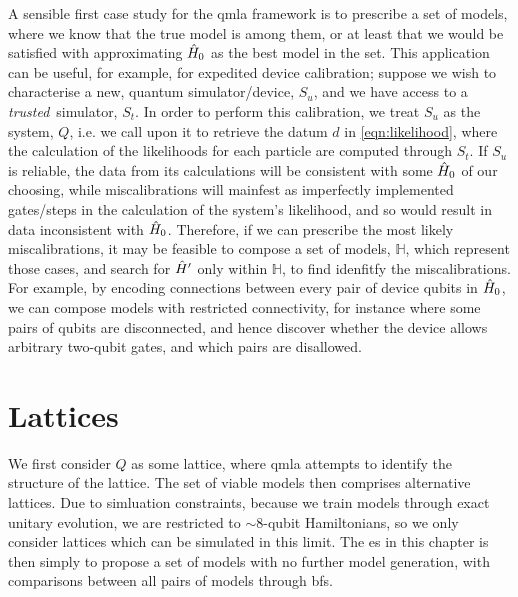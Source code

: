 A sensible first case study for the \gls{qmla} framework is to prescribe a set of models, 
    where we know that the true model is among them, or at least that we would be satisfied with 
    approximating $\hat{H}_0$ as the best model in the set. 
This application can be useful, for example, for expedited device calibration; 
    suppose we wish to characterise a new,  quantum simulator/device, $S_u$, 
    and we have access to a \emph{trusted}\footnotemark \  simulator, $S_t$. 
In order to perform this calibration, 
    we treat $S_u$ as the system, $Q$, i.e. we call upon it to retrieve the datum $d$ in \cref{eqn:likelihood}, 
    where the calculation of the likelihoods for each particle are computed through $S_t$. 
If $S_u$ is reliable, the data from its calculations will be consistent with some $\hat{H}_0$ of our choosing, 
    while miscalibrations will mainfest as imperfectly implemented gates/steps in the calculation of the system's likelihood, 
    and so would result in data inconsistent with $\hat{H}_0$. 
Therefore, if we can prescribe the most likely miscalibrations, it may be feasible to compose a set 
    of models, $\mathbb{H}$, which represent those cases, and search for $\hat{H}^{\prime}$ only within $\mathbb{H}$,
    to find idenfitfy the miscalibrations. 
For example, by encoding connections between every pair of device qubits in $\hat{H}_0$, 
    we can compose models with restricted connectivity, for instance where some pairs of qubits are disconnected, 
    and hence discover whether the device allows arbitrary two-qubit gates, 
    and which pairs are disallowed. 



\section{Lattices}\label{sec:lattices}
We first consider $Q$ as some lattice, where \gls{qmla} attempts to identify the structure of the lattice. 
The set of viable models then comprises alternative lattices.
Due to simluation constraints, because we train models through exact unitary evolution, 
    we are restricted to $\sim 8$-qubit Hamiltonians, so we only consider lattices which can 
    be simulated in this limit. 
The \gls{es} in this chapter is then simply to propose a set of models with no further model generation, 
    with comparisons between all pairs of models through \glspl{bf}.
\par

